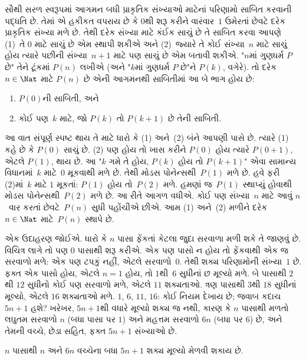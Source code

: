 સૌથી સરળ સ્વરૂપમાં આગમન બધી પ્રાકૃતિક સંખ્યાઓ માટેનાં પરિણામો
સાબિત કરવાની પદ્ધતિ છે. તેમાં એ હકીકત વપરાય છે કે $0$થી શરૂ
કરીને વારંવાર~$1$ ઉમેરતાં છેવટે દરેક પ્રાકૃતિક સંખ્યા મળે છે.
તેથી દરેક સંખ્યા માટે કંઈક સાચું છે તે સાબિત કરવા આપણે
(1)~તે $0$ માટે સાચું છે એમ સ્થાપી શકીએ અને (2)~જ્યારે તે
કોઈ સંખ્યા~$n$ માટે સાચું હોય ત્યારે પછીની સંખ્યા~$n+1$
માટે પણ સાચું છે એમ બતાવી શકીએ. "$n$માં ગુણધર્મ $P$ છે"
તેને ટૂંકમાં $P(n)$ લખીએ (અને "$k$માં ગુણધર્મ $P$ છે"ને
$P(k)$, વગેરે). તો દરેક $n \in \Nat$ માટે $P(n)$ છે એની
આગમનથી સાબિતીમાં આ બે ભાગ હોય છે:
\begin{enumerate}
\item $P(0)$ની સાબિતી, અને
\item કોઈ પણ~$k$ માટે, જો $P(k)$ તો $P(k+1)$ છે તેની સાબિતી.
\end{enumerate}
આ વાત સંપૂર્ણ સ્પષ્ટ થાય તે માટે ધારો કે (1) અને~(2) બંને
આપણી પાસે છે. ત્યારે (1) કહે છે કે $P(0)$ સાચું છે. (2) પણ
હોય તો ખાસ કરીને $P(0)$ હોય ત્યારે $P(0+1)$, એટલે $P(1)$,
થાય છે. આ "$k$ ગમે તે હોય, $P(k)$ હોય તો $P(k+1)$" એવા
સામાન્ય વિધાનમાં~$k$ માટે~$0$ મૂકવાથી મળે છે. તેથી
મોડસ પોનેન્સથી~$P(1)$ મળે છે. હવે ફરી (2)માં~$k$ માટે
$1$ મૂકતાં: $P(1)$ હોય તો~$P(2)$ મળે. હમણાં જ~$P(1)$
સ્થાપ્યું હોવાથી મોડસ પોનેન્સથી~$P(2)$ મળે છે. આ રીતે
આગળ વધીએ. કોઈ પણ સંખ્યા~$n$ માટે આવું $n$~વાર કરતાં
છેવટે~$P(n)$ સુધી પહોંચીએ છીએ. આમ (1) અને~(2) મળીને
દરેક $n \in \Nat$ માટે~$P(n)$ સ્થાપે છે.

એક ઉદાહરણ જોઈએ. ધારો કે $n$ પાસા ફેંકતાં કેટલા જુદા
સરવાળા મળી શકે તે જાણવું છે. વિચિત્ર લાગે તો પણ $0$ પાસાથી
શરૂ કરીએ. એક પણ પાસો ન હોય તો ફેંકવાથી એક જ સરવાળો મળે:
એક પણ ટપકું નહીં, એટલે સરવાળો~$0$. તેથી શક્ય પરિણામોની
સંખ્યા~$1$ છે. ફક્ત એક પાસો હોય, એટલે $n=1$ હોય, તો
$1$થી~$6$ સુધીનાં છ મૂલ્યો મળે. બે પાસાથી $2$થી $12$
સુધીનો કોઈ પણ સરવાળો મળે, એટલે $11$ શક્યતાઓ. ત્રણ
પાસાથી $3$થી $18$ સુધીનાં મૂલ્યો, એટલે $16$ શક્યતાઓ
મળે. $1$, $6$, $11$, $16$: કોઈ નિયમ દેખાય છે; જવાબ
કદાચ $5n+1$ હશે? ખરેખર, $5n+1$થી વધારે મૂલ્યો શક્ય જ
નથી, કારણ કે $n$ પાસાથી મળતો લઘુતમ સરવાળો $n$ (બધા
પાસા પર $1$) અને મહત્તમ સરવાળો $6n$ (બધા પર $6$) છે,
અને તેમની વચ્ચે, છેડા સહિત, ફક્ત $5n+1$ સંખ્યાઓ છે.

\begin{thm}
  $n$ પાસાથી $n$ અને $6n$ વચ્ચેના બધા $5n+1$ શક્ય મૂલ્યો
  મેળવી શકાય છે.
\end{thm}

